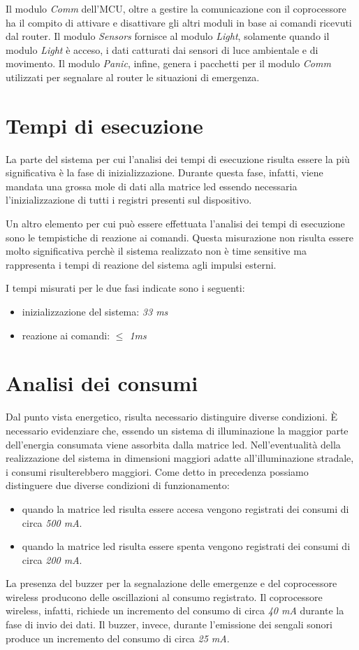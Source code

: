 \documentclass{article}
\begin{document}
	Il modulo \textit{Comm} dell'MCU, oltre a gestire la comunicazione con il coprocessore ha il compito di attivare e disattivare gli altri moduli in base ai comandi ricevuti dal router.
	Il modulo \textit{Sensors} fornisce al modulo \textit{Light}, solamente quando il modulo \textit{Light} \`e acceso, i dati catturati dai sensori di luce ambientale e di movimento.
	Il modulo \textit{Panic}, infine, genera i pacchetti per il modulo \textit{Comm} utilizzati per segnalare al router le situazioni di emergenza.
	
	\section{Tempi di esecuzione}
	La parte del sistema per cui l'analisi dei tempi di esecuzione risulta essere la pi\`u significativa \`e la fase di inizializzazione.
	Durante questa fase, infatti, viene mandata una grossa mole di dati alla matrice led essendo necessaria l'inizializzazione di tutti i registri presenti sul dispositivo.
	
	\noindent Un altro elemento per cui pu\`o essere effettuata l'analisi dei tempi di esecuzione sono le tempistiche di reazione ai comandi.
	Questa misurazione non risulta essere molto significativa perch\`e il sistema realizzato non \`e time sensitive ma rappresenta i tempi di reazione del sistema agli impulsi esterni.
	
	\noindent I tempi misurati per le due fasi indicate sono i seguenti:
	\begin{itemize}
		\item inizializzazione del sistema: \textit{33 ms}
		\item reazione ai comandi: \textit{$\leq$ 1ms}
	\end{itemize}
	
	\section{Analisi dei consumi}
	Dal punto vista energetico, risulta necessario distinguire diverse condizioni.
	\`E necessario evidenziare che, essendo un sistema di illuminazione la maggior parte dell'energia consumata viene assorbita dalla matrice led. Nell'eventualit\`a della realizzazione del sistema in dimensioni maggiori adatte all'illuminazione stradale, i consumi risulterebbero maggiori.
	Come detto in precedenza possiamo distinguere due diverse condizioni di funzionamento:
	\begin{itemize}
		\item quando  la matrice led risulta essere accesa vengono registrati dei consumi di circa \textit{500 mA}.
		\item quando la matrice led risulta essere spenta vengono registrati dei consumi di circa \textit{200 mA}.
	\end{itemize}
	La presenza del buzzer per la segnalazione delle emergenze e del coprocessore wireless producono delle oscillazioni al consumo registrato. Il coprocessore wireless, infatti, richiede un incremento del consumo di circa \textit{40 mA} durante la fase di invio dei dati. Il buzzer, invece, durante l'emissione dei sengali sonori produce un incremento del consumo di circa \textit{25 mA}.
	
\end{document}
